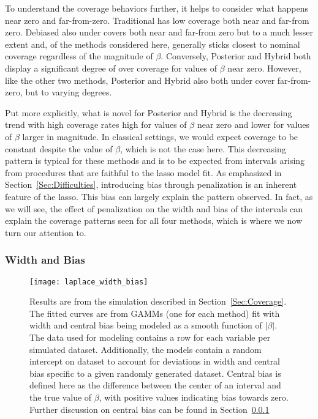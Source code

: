 To understand the coverage behaviors further, it helps to consider what happens near zero and far-from-zero. Traditional has low coverage both near and far-from zero. Debiased also under covers both near and far-from zero but to a much lesser extent and, of the methods considered here, generally sticks closest to nominal coverage regardless of the magnitude of $\beta$. Conversely, Posterior and Hybrid both display a significant degree of over coverage for values of $\beta$ near zero. However, like the other two methods, Posterior and Hybrid also both under cover far-from-zero, but to varying degrees. 

Put more explicitly, what is novel for Posterior and Hybrid is the decreasing trend with high coverage rates high for values of $\beta$ near zero and lower for values of $\beta$ larger in magnitude. In classical settings, we would expect coverage to be constant despite the value of $\beta$, which is not the case here. This decreasing pattern is typical for these methods and is to be expected from intervals arising from procedures that are faithful to the lasso model fit. As emphasized in Section~\ref{Sec:Difficulties}, introducing bias through penalization is an inherent feature of the lasso. This bias can largely explain the pattern observed. In fact, as we will see, the effect of penalization on the width and bias of the intervals can explain the coverage patterns seen for all four methods, which is where we now turn our attention to.

\subsubsection{Width and Bias}\label{Sec:Width and Bias}

\begin{figure}[hbtp]
  \begin{center}
  \texttt{[image: laplace\_width\_bias]}
  \caption{\label{Fig:laplace_width_bias} Results are from the simulation described in Section~\ref{Sec:Coverage}. The fitted curves are from GAMMs (one for each method) fit with width and central bias being modeled as a smooth function of $|\beta|$. The data used for modeling contains a row for each variable per simulated dataset. Additionally, the models contain a random intercept on dataset to account for deviations in width and central bias specific to a given randomly generated dataset. Central bias is defined here as the difference between the center of an interval and the true value of $\beta$, with positive values indicating bias towards zero. Further discussion on central bias can be found in Section~\ref{Sec:Width and Bias}}
  \end{center}
\end{figure}

